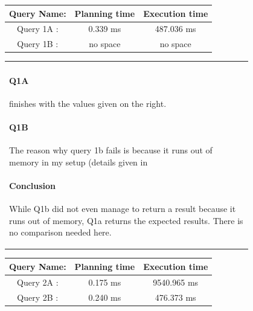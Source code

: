 \documentclass[10pt]{article}
\begin{document}
\begin{enumerate}
\begin{itemize}
				\clearpage
				                                       
			\end{itemize}
			
			\begin{figure}[H]
				\begin{minipage}[]{0.45\linewidth}
					\begin{tabular}[t]{|c|c|c|}
						\hline
						Query Name: & Planning time & Execution time \\
						\hline
						Query 1A :  & 0.339 ms		& 487.036 ms\\ 
						Query 1B :  & no space		& no space \\
						\hline
					\end{tabular}
				\end{minipage}
				\hspace{0.1cm}
				\begin{minipage}[b]{0.55\linewidth}
					\begin{tabular}{p{0.95\linewidth}}
						\paragraph{Q1A}finishes with the values given on the right.
						\paragraph{Q1B}The reason why query 1b fails is because it runs out of memory in my setup (details given in %
						\paragraph{Conclusion} While Q1b did not even manage to return a result because it runs out of memory, Q1a returns the expected results. There is no comparison needed here.
					\end{tabular}
				\end{minipage}
			\end{figure}
			
			
			\begin{figure}[H]
				\begin{minipage}[]{0.45\linewidth}
					\begin{tabular}[t]{|c|c|c|}
						\hline
						Query Name: & Planning time & Execution time \\
						\hline
						Query 2A :  &  0.175 ms		& 9540.965 ms\\ 
						Query 2B :  &  0.240 ms		& 476.373 ms\\
						\hline
					\end{tabular}
				\end{minipage}
				\hspace{0.1cm}
				\begin{minipage}[b]{0.55\linewidth}
					\begin{tabular}{p{0.95\linewidth}}

\end{tabular}
\end{minipage}
\end{figure}
\end{enumerate}
\end{document}
